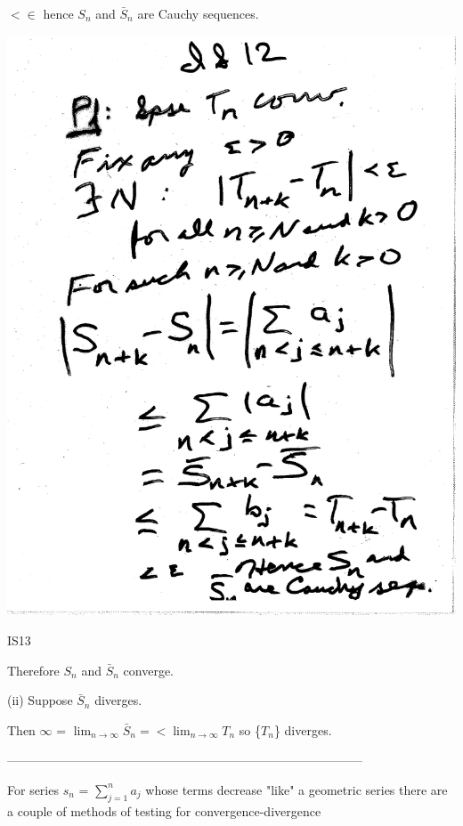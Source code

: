 \documentclass[10pt,a4paper]{article}
\begin{document}
$< \in$ hence $S_n$ and $\bar{S}_n$ are Cauchy sequences.

\includegraphics[scale=.5]{Pages/IS_12}

\newpage

\begin{center}
IS13
\end{center}

Therefore $S_n$ and $\bar{S}_n$ converge.

(ii) Suppose $\bar{S}_n$ diverges.

Then $\infty$ = $\lim_{n\to\infty} \bar{S}_n =<\lim_{n\to\infty}T_n$ so \{$T_n$\} diverges.

--------------------------------------------------------------------------------------

For series $s_n$ = $\sum_{j=1}^{n}a_j$
whose terms decrease "like" a geometric series there are a couple of methods of testing for convergence-divergence
\end{document}

